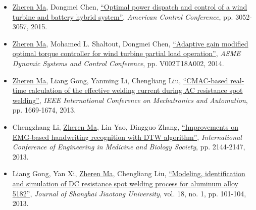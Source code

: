 \documentclass[margin, 9pt]{res}
\begin{document}
\begin{resume}
\begin{itemize}[leftmargin=*]
	\item \underline{Zheren Ma},  Dongmei Chen,
          \href{http://ieeexplore.ieee.org/xpl/login.jsp?tp=&arnumber=7171801&url=http\%3A\%2F\%2Fieeexplore.ieee.org\%2Fxpls\%2Fabs_all.jsp\%3Farnumber\%3D7171801}
          {``Optimal power dispatch and control of a wind turbine and battery hybrid system''},
          \textit{American Control Conference}, pp. 3052-3057, 2015.

	\item \underline{Zheren Ma}, Mohamed L. Shaltout, Dongmei Chen,
          \href{http://proceedings.asmedigitalcollection.asme.org/proceeding.aspx?articleid=2086149}
          {``Adaptive gain modified optimal torque controller for wind turbine partial load operation''},
          \textit{ASME Dynamic Systems and Control Conference}, pp. V002T18A002, 2014.

	\item \underline{Zheren Ma}, Liang Gong, Yanming Li, Chengliang Liu,
          \href{http://ieeexplore.ieee.org/xpl/login.jsp?tp=&arnumber=6618166&url=http\%3A\%2F\%2Fieeexplore.ieee.org\%2Fxpls\%2Fabs_all.jsp\%3Farnumber\%3D6618166}
          {``CMAC-based real-time calculation of the effective welding current during AC resistance spot welding''},
          \textit{IEEE International Conference on Mechatronics and Automation}, pp. 1669-1674, 2013.

    \item Chengzhang Li, \underline{Zheren Ma}, Lin Yao, Dingguo Zhang,
          \href{http://ieeexplore.ieee.org/xpl/login.jsp?tp=&arnumber=6609958&url=http\%3A\%2F\%2Fieeexplore.ieee.org\%2Fiel7\%2F6596169\%2F6609410\%2F06609958.pdf\%3Farnumber\%3D6609958}
          {``Improvements on EMG-based handwriting recognition with DTW algorithm''},
          \textit{ International Conference of Engineering in Medicine and Biology Society}, pp. 2144-2147, 2013.

    \item Liang Gong, Yan Xi, \underline{Zheren Ma}, Chengliang Liu,
          \href{http://link.springer.com/article/10.1007\%2Fs12204-013-1371-8}
          {``Modeling, identification and simulation of DC resistance spot welding process for aluminum alloy 5182''},
          \textit{Journal of Shanghai Jiaotong University}, vol. 18, no. 1, pp. 101-104, 2013.
\end{itemize}



\end{resume}
\end{document}
